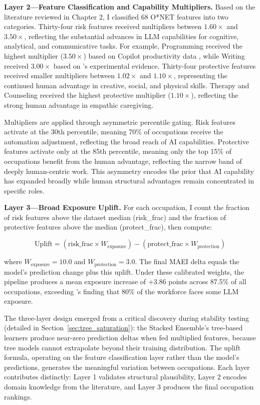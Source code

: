 \textbf{Layer 2---Feature Classification and Capability Multipliers.} Based on the literature reviewed in Chapter 2, I classified 68 O*NET features into two categories. Thirty-four risk features received multipliers between $1.60\times$ and $3.50\times$, reflecting the substantial advances in LLM capabilities for cognitive, analytical, and communicative tasks. For example, Programming received the highest multiplier ($3.50\times$) based on Copilot productivity data \citep{Peng_Kalliamvakou_2023}, while Writing received $3.00\times$ based on \citet{Noy_Zhang_2023}'s experimental evidence. Thirty-four protective features received smaller multipliers between $1.02\times$ and $1.10\times$, representing the continued human advantage in creative, social, and physical skills. Therapy and Counseling received the highest protective multiplier ($1.10\times$), reflecting the strong human advantage in empathic caregiving.

Multipliers are applied through asymmetric percentile gating. Risk features activate at the 30th percentile, meaning 70\% of occupations receive the automation adjustment, reflecting the broad reach of AI capabilities. Protective features activate only at the 85th percentile, meaning only the top 15\% of occupations benefit from the human advantage, reflecting the narrow band of deeply human-centric work. This asymmetry encodes the prior that AI capability has expanded broadly while human structural advantages remain concentrated in specific roles.

\textbf{Layer 3---Broad Exposure Uplift.} For each occupation, I count the fraction of risk features above the dataset median (risk\_frac) and the fraction of protective features above the median (protect\_frac), then compute:

\begin{equation}
\text{Uplift} = (\text{risk\_frac} \times W_{\text{exposure}}) - (\text{protect\_frac} \times W_{\text{protection}})
\end{equation}

\noindent where $W_{\text{exposure}} = 10.0$ and $W_{\text{protection}} = 3.0$. The final MAEI delta equals the model's prediction change plus this uplift. Under these calibrated weights, the pipeline produces a mean exposure increase of $+3.86$ points across 87.5\% of all occupations, exceeding \citet{Eloundou_Manning_2023}'s finding that 80\% of the workforce faces some LLM exposure.

The three-layer design emerged from a critical discovery during stability testing (detailed in Section~\ref{sec:tree_saturation}): the Stacked Ensemble's tree-based learners produce near-zero prediction deltas when fed multiplied features, because tree models cannot extrapolate beyond their training distribution. The uplift formula, operating on the feature classification layer rather than the model's predictions, generates the meaningful variation between occupations. Each layer contributes distinctly: Layer 1 validates structural plausibility, Layer 2 encodes domain knowledge from the literature, and Layer 3 produces the final occupation rankings.

